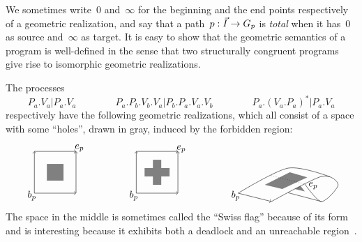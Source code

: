 \documentclass[orivec]{llncs} \usepackage[T1]{fontenc}
\renewcommand{\P}[1]{P_{#1}}
\newcommand{\V}[1]{V_{#1}}
\begin{document}
\noindent
We sometimes write~$0$ and~$\infty$ for the beginning and the end points
respectively of a geometric realization, and say that a path~$p:\vec{I}\to G_p$ is
\emph{total} when it has~$0$ as source and~$\infty$ as target. It is easy to
show that the geometric semantics of a program is well-defined in the sense that
two structurally congruent programs give rise to isomorphic geometric
realizations.



\begin{example}
The processes
\[
  \P{a}.\V{a}|\P{a}.\V{a}
  \qquad\qquad
  \P{a}.\P{b}.\V{b}.\V{a}|\P{b}.\P{a}.\V{a}.\V{b}
  \qquad\qquad
  \P{a}.(\V{a}.\P{a})^*|\P a.\V a
  \]
  respectively have the following geometric realizations, which all consist of a
  space with some ``holes'', drawn in gray, induced by the forbidden region:
  \[
  \begin{tikzpicture}[scale=0.3]
    \draw (-.3,-.3) node {$b_p$};
    \draw (5.4,5.4) node {$e_p$};
    \draw[->] (0,0) -- (5,0);
    \draw[->] (0,0) -- (0,5);
    \draw[->] (5,0) -- (5,5);
    \draw[->] (0,5) -- (5,5);
    \fill[fill=gray] (1.5,1.5) -- (1.5,3.5) -- (3.5,3.5) -- (3.5,1.5) -- cycle;
  \end{tikzpicture}
  \qquad\qquad
  \begin{tikzpicture}[scale=0.3]
    \draw (-.3,-.3) node {$b_p$};
    \draw (5.4,5.3) node {$e_p$};
    \draw[->] (0,0) -- (5,0);
    \draw[->] (0,0) -- (0,5);
    \draw[->] (5,0) -- (5,5);
    \draw[->] (0,5) -- (5,5);
    \fill[fill=gray] (1,2) -- (1,3) -- (4,3) -- (4,2) -- cycle;
    \fill[fill=gray] (2,1) -- (2,4) -- (3,4) -- (3,1) -- cycle;
  \end{tikzpicture}
  \qquad\qquad
  \begin{tikzpicture}[scale=0.3]
    \fill[fill=gray] (3.2,1) -- (5.3,0.5) -- (8.3,1.9) -- (6.2,2.5) -- cycle;
    \fill[fill=gray] (7.5,.85) -- (8,.2) -- (6.8,.5) -- cycle;
    \draw (-.3,-.3) node {$b_p$};
    \draw (9,0.9) node {$e_p$};
    \draw[->] (0,0) -- (4,-1);
\draw plot[smooth] coordinates { (4,-1) (10,2) (12,1) (10,-1) (8,1.1)};
    \draw plot[smooth] coordinates { (0,0) (6,3) (11,1.97) };
    \draw plot[smooth] coordinates { (10,-1) (6,.05)};
    \draw[dotted] (4,2.1) -- (8,1.1);
  \end{tikzpicture}
  \]
  The space in the middle is sometimes called the ``Swiss flag'' because of its
  form and is interesting because it exhibits both a deadlock and an unreachable
  region~\cite{tcs}.
\end{example}
\end{document}
